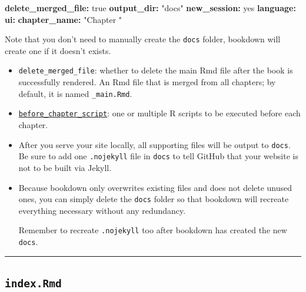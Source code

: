 \documentclass[
  a4paper,
  twoside,
  openright]{book}
\newenvironment{Shaded}{\begin{snugshade}}{\end{snugshade}}
\newcommand{\AttributeTok}[1]{\textcolor[rgb]{0.13,0.29,0.53}{#1}}
\newcommand{\CharTok}[1]{\textcolor[rgb]{0.31,0.60,0.02}{#1}}
\newcommand{\FunctionTok}[1]{\textcolor[rgb]{0.13,0.29,0.53}{\textbf{#1}}}
\newcommand{\KeywordTok}[1]{\textcolor[rgb]{0.13,0.29,0.53}{\textbf{#1}}}
\newcommand{\StringTok}[1]{\textcolor[rgb]{0.31,0.60,0.02}{#1}}
\theoremstyle{definition}
\theoremstyle{definition}
\theoremstyle{definition}
\theoremstyle{definition}
\theoremstyle{remark}
\begin{document}
\begin{Shaded}
\begin{Highlighting}[]
\FunctionTok{delete\_merged\_file}\KeywordTok{:}\AttributeTok{ }\CharTok{true}
\FunctionTok{output\_dir}\KeywordTok{:}\AttributeTok{ }\StringTok{"docs"}
\FunctionTok{new\_session}\KeywordTok{:}\AttributeTok{ }\CharTok{yes}
\FunctionTok{language}\KeywordTok{:}
\AttributeTok{  }\FunctionTok{ui}\KeywordTok{:}
\AttributeTok{    }\FunctionTok{chapter\_name}\KeywordTok{:}\AttributeTok{ }\StringTok{"Chapter "}
\end{Highlighting}
\end{Shaded}

Note that you don't need to manually create the \texttt{docs} folder, bookdown will create one if it doesn't exists.

\begin{itemize}
\item
  \texttt{delete\_merged\_file}: whether to delete the main Rmd file after the book is successfully rendered. An Rmd file that is merged from all chapters; by default, it is named \texttt{\_main.Rmd}.
\item
  \href{https://github.com/rstudio/bookdown/issues/1252\#issuecomment-913530117}{\texttt{before\_chapter\_script}}: one or multiple R scripts to be executed before each chapter.
\item
  After you serve your site locally, all supporting files will be output to \texttt{docs}. Be sure to add one \texttt{.nojekyll} file in \texttt{docs} to tell GitHub that your website is not to be built via Jekyll.
\item
  Because bookdown only overwrites existing files and does not delete unused ones, you can simply delete the \texttt{docs} folder so that bookdown will recreate everything necessary without any redundancy.

  Remember to recreate \texttt{.nojekyll} too after bookdown has created the new \texttt{docs}.
\end{itemize}

\begin{center}\rule{0.5\linewidth}{0.5pt}\end{center}

\subsection*{\texorpdfstring{\texttt{index.Rmd}}{index.Rmd}}\label{index.rmd-1}
\end{document}
